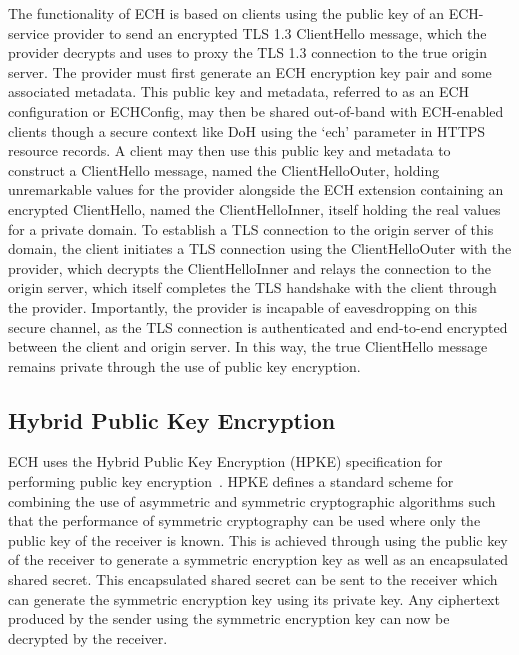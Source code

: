 The functionality of ECH is based on clients using the public key of an ECH-service provider to send an encrypted TLS 1.3 ClientHello message, which the provider decrypts and uses to proxy the TLS 1.3 connection to the true origin server. The provider must first generate an ECH encryption key pair and some associated metadata. This public key and metadata, referred to as an ECH configuration or ECHConfig, may then be shared out-of-band with ECH-enabled clients though a secure context like DoH using the `ech' parameter in HTTPS resource records. A client may then use this public key and metadata to construct a ClientHello message, named the ClientHelloOuter, holding unremarkable values for the provider alongside the ECH extension containing an encrypted ClientHello, named the ClientHelloInner, itself holding the real values for a private domain. To establish a TLS connection to the origin server of this domain, the client initiates a TLS connection using the ClientHelloOuter with the provider, which decrypts the ClientHelloInner and relays the connection to the origin server, which itself completes the TLS handshake with the client through the provider. Importantly, the provider is incapable of eavesdropping on this secure channel, as the TLS connection is authenticated and end-to-end encrypted between the client and origin server. In this way, the true ClientHello message remains private through the use of public key encryption.

\subsection{Hybrid Public Key Encryption}

ECH uses the Hybrid Public Key Encryption (HPKE) specification for performing public key encryption~\cite{rfc9180}. HPKE defines a standard scheme for combining the use of asymmetric and symmetric cryptographic algorithms such that the performance of symmetric cryptography can be used where only the public key of the receiver is known. This is achieved through using the public key of the receiver to generate a symmetric encryption key as well as an encapsulated shared secret. This encapsulated shared secret can be sent to the receiver which can generate the symmetric encryption key using its private key. Any ciphertext produced by the sender using the symmetric encryption key can now be decrypted by the receiver.


